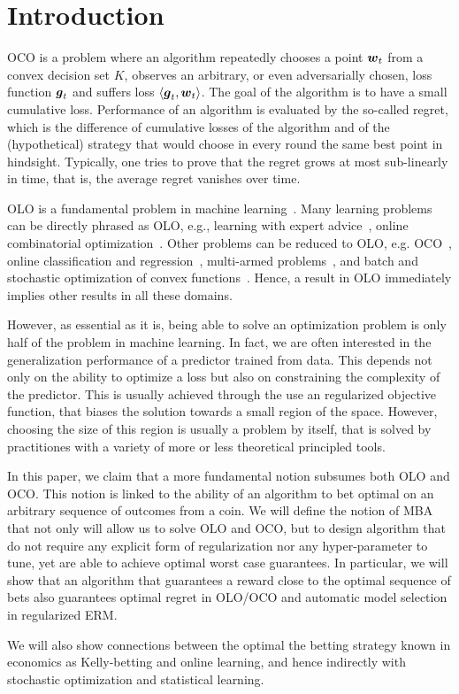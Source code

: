 \section{Introduction}
\label{sec:intro}

\ac{OCO} is a problem where an algorithm repeatedly chooses a point $\boldsymbol{w}_t$ from a convex decision set $K$, observes an arbitrary, or even adversarially chosen, loss function $\boldsymbol{g}_t$ and suffers loss $\langle \boldsymbol{g}_t, \boldsymbol{w}_t \rangle$.  The goal of the algorithm is to have a small cumulative loss. Performance of an algorithm is evaluated by the so-called regret, which is the difference of cumulative losses of the algorithm and of the (hypothetical) strategy that would choose in every round the same best point in hindsight.
Typically, one tries to prove that the regret grows at most sub-linearly in time, that is, the average regret vanishes over time.

\ac{OLO} is a fundamental problem in machine learning~\citep{Cesa-BianchiL06,Shalev-Shwartz12}.  Many learning problems can be directly phrased as \ac{OLO}, e.g., learning with expert advice~\citep{LittlestoneW94,Vovk98,Cesa-BianchiFHHSW97}, online combinatorial optimization~\cite{KoolenWK10}. Other problems can be reduced to \ac{OLO}, e.g. \ac{OCO}~\citep[Chapter~2]{Shalev-Shwartz12}, online classification and regression~\citep[Chapters~11~and~12]{Cesa-BianchiL06}, multi-armed problems~\citep[Chapter~6]{Cesa-BianchiL06}, and batch and stochastic optimization of convex functions~\cite{NemirovskyY83}.  Hence, a result in \ac{OLO} immediately implies other results in all these domains.

However, as essential as it is, being able to solve an optimization problem is only half of the problem in machine learning. In fact, we are often interested in the generalization performance of a predictor trained from data. This depends not only on the ability to optimize a loss but also on constraining the complexity of the predictor. This is usually achieved through the use an regularized objective function, that biases the solution towards a small region of the space. However, choosing the size of this region is usually a problem by itself, that is solved by practitiones with a variety of more or less theoretical principled tools.

In this paper, we claim that a more fundamental notion subsumes both \ac{OLO} and \ac{OCO}. This notion is linked to the ability of an algorithm to bet optimal on an arbitrary sequence of outcomes from a coin. We will define the notion of \ac{MBA} that not only will allow us to solve \ac{OLO} and \ac{OCO}, but to design algorithm that do not require any explicit form of regularization nor any hyper-parameter to tune, yet are able to achieve optimal worst case guarantees. 
In particular, we will show that an algorithm that guarantees a reward close to the optimal sequence of bets also guarantees optimal regret in \ac{OLO}/\ac{OCO} and automatic model selection in regularized \ac{ERM}.

We will also show connections between the optimal the betting strategy known in economics as Kelly-betting \cite{} and online learning, and hence indirectly with stochastic optimization and statistical learning.